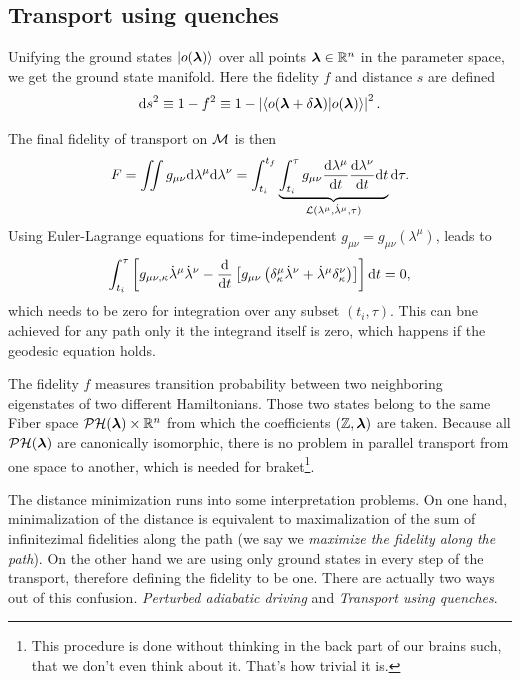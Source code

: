 \subsection{Transport using quenches}
\label{sec:quenches}
Unifying the ground states $\ket{o({\bm\lambda})}$ over all points ${\bm\lambda}\in\mathbb{R}^n$ in the parameter space, we get the ground state manifold. Here the fidelity $f$ and distance $s$ are defined
\begin{equation}
    \mathrm{d} s^2 \equiv 1-f^2\equiv 1-\left|\braket{o(\bm{{\bm\lambda}}+\delta\bm{{\bm\lambda}})|o(\bm{{\bm\lambda}})}\right|^2.
    \label{eq:distanceOnM0}
\end{equation}

The final fidelity of transport on $\mathcal{M}$ is then
\begin{equation}
    F=\iint g_{\mu\nu}\mathrm{d}\lambda^\mu\mathrm{d}\lambda^\nu = \int_{t_i}^{t_f}\underbrace{\int_{t_i}^\tau g_{\mu\nu}\frac{\mathrm{d} \lambda^\mu}{\mathrm{d} t}\frac{\mathrm{d} \lambda^\nu}{\mathrm{d} t} \mathrm{d} t}_{\mathcal{L}(\lambda^\mu,\dot\lambda^\mu,\tau)}\mathrm{d} \tau .
\end{equation}
Using Euler-Lagrange equations for time-independent $g_{\mu\nu}=g_{\mu\nu}(\lambda^\mu)$, leads to
\begin{equation}
    \int_{t_i}^{\tau}\left[g_{\mu\nu,\kappa}\dot\lambda^\mu\dot\lambda^\nu - \frac{\mathrm{d} }{\mathrm{d} t}\left[g_{\mu\nu}\left(\delta^\mu_\kappa\dot\lambda^\nu+\dot\lambda^\mu\delta^\nu_\kappa\right)\right]\right]\mathrm{d} t=0,
\end{equation}
which needs to be zero for integration over any subset $(t_i,\tau)$. This can bne achieved for any path only it the integrand itself is zero, which happens if the geodesic equation holds.

The fidelity $f$ measures transition probability between two neighboring eigenstates of two different Hamiltonians. Those two states belong to the same Fiber space $\mathcal{PH}({\bm\lambda})\times \mathbb{R}^n$ from which the coefficients $(\mathbb{Z},{\bm\lambda})$ are taken. Because all $\mathcal{PH}({\bm\lambda})$ are canonically isomorphic, there is no problem in parallel transport from one space to another, which is needed for braket\footnote{This procedure is done without thinking in the back part of our brains such, that we don't even think about it. That's how trivial it is.}.

The distance minimization runs into some interpretation problems. On one hand, minimalization of the distance is equivalent to maximalization of the sum of infinitezimal fidelities along the path (we say we \emph{maximize the fidelity along the path}). On the other hand we are using only ground states in every step of the transport, therefore defining the fidelity to be one. There are actually two ways out of this confusion. \emph{Perturbed adiabatic driving} and \emph{Transport using quenches}.


